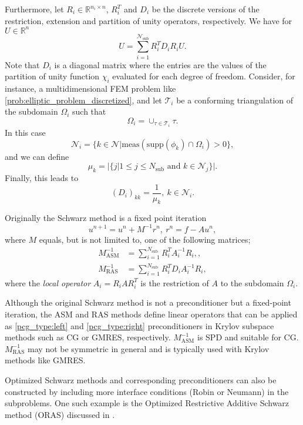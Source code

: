 Furthermore, let $R_i\in\mathbb{R}^{n_i \times n}$, $R_i^T$ and $D_i$ be the discrete versions of the restriction, extension and partition of unity operators, respectively. We have for $U \in \mathbb{R}^{n}$
\[
  U = \sum_{i=1}^{\mathcal{N}_{\text{sub}}} R_i^T D_i R_i U.
\]
Note that $D_i$ is a diagonal matrix where the entries are the values of the partition of unity function $\chi_i$ evaluated for each degree of freedom. Consider, for instance, a multidimensional FEM problem like \cref{prob:elliptic_problem_discretized}, and let $\mathcal{T}_i$ be a conforming triangulation of the subdomain $\Omega_i$ such that
\[
  \Omega_i = \cup_{\tau \in \mathcal{T}_i} \tau.
\]
In this case
\[
  \mathcal{N}_i = \{k\in\mathcal{N}| \text{meas}(\text{supp}(\phi_k)\cap\Omega_i)>0\},
\]
and we can define
\[
  \mu_k = |\{j| 1\leq j \leq N_{\text{sub}} \text{ and } k\in\mathcal{N}_j\}|.
\]
Finally, this leads to
\begin{equation}
  (D_i)_{kk} = \frac{1}{\mu_k}, \ k \in \mathcal{N}_i.
  \label{eq:schwarz_partition_of_unity_FEM}
\end{equation}

Originally the Schwarz method is a fixed point iteration \cite[Definitions 1.12 and 1.13]{schwarz_methods_Dolean_2015}
\[
  u^{n+1} = u^n + M^{-1}r^n, \ r^n = f - A u^n,
\]
where $M$ equals, but is not limited to, one of the following matrices;
\begin{subequations}
  \begin{align}
    M^{-1}_{\text{ASM}} & = \sum_{i=1}^{N_{\text{sub}}} R_i^T A_i^{-1} R_i, \label{eq:ASM_preconditioner},     \\
    M^{-1}_{\text{RAS}} & = \sum_{i=1}^{N_{\text{sub}}} R_i^T D_i A_i^{-1} R_i \label{eq:RAS_preconditioner},
  \end{align}
\end{subequations}
where the \textit{local operator} $A_i = R_i A R_i^T$ is the restriction of $A$ to the subdomain $\Omega_i$. 

Although the original Schwarz method is not a preconditioner but a fixed-point iteration, the ASM and RAS methods define linear operators that can be applied as \ref{pcg_type:left} and \ref{pcg_type:right} preconditioners in Krylov subspace methods such as CG or GMRES, respectively. $M^{-1}_{\text{ASM}}$ is SPD and suitable for CG. $M^{-1}_{\text{RAS}}$ may not be symmetric in general and is typically used with Krylov methods like GMRES.

Optimized Schwarz methods and corresponding preconditioners can also be constructed by including more interface conditions (Robin or Neumann) in the subproblems. One such example is the Optimized Restrictive Additive Schwarz method (ORAS) discussed in \cite[Chapter 2]{schwarz_methods_Dolean_2015}.

